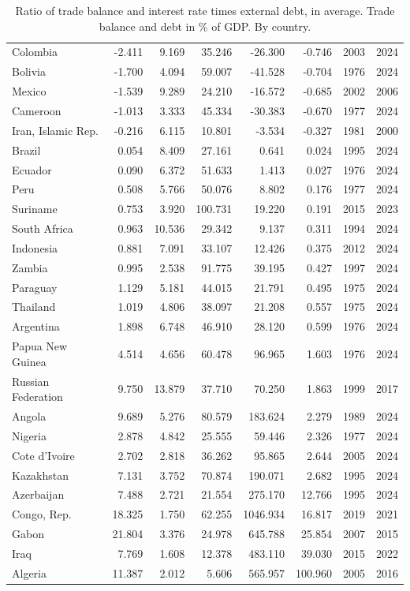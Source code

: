 \begin{table}[p]
{\begin{tabular}{lrrrrrrr}
  Colombia & -2.411 & 9.169 & 35.246 & -26.300 & -0.746 & 2003 & 2024 \\ 
  Bolivia & -1.700 & 4.094 & 59.007 & -41.528 & -0.704 & 1976 & 2024 \\ 
  Mexico & -1.539 & 9.289 & 24.210 & -16.572 & -0.685 & 2002 & 2006 \\ 
  Cameroon & -1.013 & 3.333 & 45.334 & -30.383 & -0.670 & 1977 & 2024 \\ 
  Iran, Islamic Rep. & -0.216 & 6.115 & 10.801 & -3.534 & -0.327 & 1981 & 2000 \\ 
  Brazil & 0.054 & 8.409 & 27.161 & 0.641 & 0.024 & 1995 & 2024 \\ 
  Ecuador & 0.090 & 6.372 & 51.633 & 1.413 & 0.027 & 1976 & 2024 \\ 
  Peru & 0.508 & 5.766 & 50.076 & 8.802 & 0.176 & 1977 & 2024 \\ 
  Suriname & 0.753 & 3.920 & 100.731 & 19.220 & 0.191 & 2015 & 2023 \\ 
  South Africa & 0.963 & 10.536 & 29.342 & 9.137 & 0.311 & 1994 & 2024 \\ 
  Indonesia & 0.881 & 7.091 & 33.107 & 12.426 & 0.375 & 2012 & 2024 \\ 
  Zambia & 0.995 & 2.538 & 91.775 & 39.195 & 0.427 & 1997 & 2024 \\ 
  Paraguay & 1.129 & 5.181 & 44.015 & 21.791 & 0.495 & 1975 & 2024 \\ 
  Thailand & 1.019 & 4.806 & 38.097 & 21.208 & 0.557 & 1975 & 2024 \\ 
  Argentina & 1.898 & 6.748 & 46.910 & 28.120 & 0.599 & 1976 & 2024 \\ 
  Papua New Guinea & 4.514 & 4.656 & 60.478 & 96.965 & 1.603 & 1976 & 2024 \\ 
  Russian Federation & 9.750 & 13.879 & 37.710 & 70.250 & 1.863 & 1999 & 2017 \\ 
  Angola & 9.689 & 5.276 & 80.579 & 183.624 & 2.279 & 1989 & 2024 \\ 
  Nigeria & 2.878 & 4.842 & 25.555 & 59.446 & 2.326 & 1977 & 2024 \\ 
  Cote d'Ivoire & 2.702 & 2.818 & 36.262 & 95.865 & 2.644 & 2005 & 2024 \\ 
  Kazakhstan & 7.131 & 3.752 & 70.874 & 190.071 & 2.682 & 1995 & 2024 \\ 
  Azerbaijan & 7.488 & 2.721 & 21.554 & 275.170 & 12.766 & 1995 & 2024 \\ 
  Congo, Rep. & 18.325 & 1.750 & 62.255 & 1046.934 & 16.817 & 2019 & 2021 \\ 
  Gabon & 21.804 & 3.376 & 24.978 & 645.788 & 25.854 & 2007 & 2015 \\ 
  Iraq & 7.769 & 1.608 & 12.378 & 483.110 & 39.030 & 2015 & 2022 \\ 
  Algeria & 11.387 & 2.012 & 5.606 & 565.957 & 100.960 & 2005 & 2016 \\ 
   \bottomrule
\end{tabular}
}
\caption{Ratio of trade balance and interest rate times external debt, in average. Trade balance and debt in \% of GDP. By country.}
\label{tab:ratio_wb}
\end{table}
